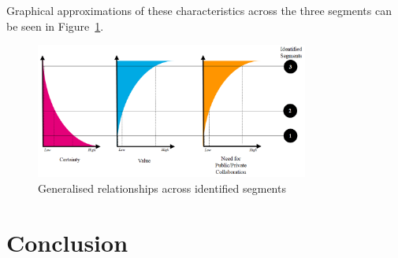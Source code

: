 \documentclass[journal]{IEEEtran}
\begin{document}
Graphical approximations of these characteristics across the three
segments can be seen in Figure~\ref{fig:segmentcharacteristics}.

\begin{figure}[htb]
\centering
\includegraphics[width=0.8\textwidth]{images/segmentcharacteristics.png}
\caption{Generalised relationships across identified segments}
\label{fig:segmentcharacteristics}
\end{figure}




 


\section{Conclusion}\label{conclusion}
\end{document}
